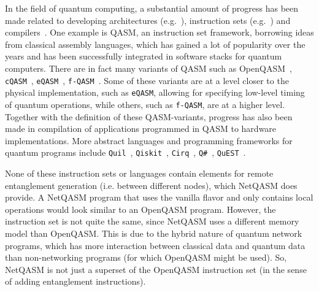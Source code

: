 In the field of quantum computing, a substantial amount of progress has been made related to developing
architectures (e.g.~\cite{fu2017microarchitecture,bourassa2020photonicblueprint, murali2019fullstack, wecker2014liqui, khammassi2020openql, amy2019staq, green2013quipper, Steiger2016}),
instruction sets (e.g.~\cite{cross2017openqasm,khammassi2018cqasm,fu2019eqasm,liu2017fqasm,smith2016quil,qiskit,cirq,qsharp,jones2019quest}) and
compilers~\cite{zulehner2019compiling, haner2018software, gokhale2020quantum, liu2020new, gokhale2020optimized, ding2020square, smith2020opensource, Sivarajah_2020, hietala2019verified, zhang2020contextmapping, niu2020hardware, dury2020qubo, pozzi2020using, Nishio_2020}.
One example is QASM, an instruction set framework, borrowing ideas from classical assembly languages, which has gained a lot of popularity over the years and has been successfully integrated in software stacks for quantum computers.
There are in fact many variants of QASM such as OpenQASM~\cite{cross2017openqasm}, \texttt{cQASM}~\cite{khammassi2018cqasm}, \texttt{eQASM}~\cite{fu2019eqasm}, \texttt{f-QASM}~\cite{liu2017fqasm}.
Some of these variants are at a level closer to the physical implementation, such as \texttt{eQASM}, allowing for specifying low-level timing of quantum operations, while others, such as \texttt{f-QASM}, are at a higher level.
Together with the definition of these QASM-variants, progress has also been made in compilation of applications programmed in QASM to hardware implementations.
More abstract languages and programming frameworks for quantum programs include \texttt{Quil}~\cite{smith2016quil}, \texttt{Qiskit}~\cite{qiskit}, \texttt{Cirq}~\cite{cirq}, \texttt{Q\#}~\cite{qsharp}, \texttt{QuEST}~\cite{jones2019quest}.

None of these instruction sets or languages contain elements for remote entanglement generation (i.e. between different nodes), which \ac{NetQASM} does provide.
A \ac{NetQASM} program that uses the vanilla flavor and only contains local operations would look similar to an OpenQASM program.
However, the instruction set is not quite the same, since \ac{NetQASM} uses a different memory model than OpenQASM.
This is due to the hybrid nature of quantum network programs, which has more interaction between classical data and quantum data than non-networking programs (for which OpenQASM might be used).
So, \ac{NetQASM} is not just a superset of the OpenQASM instruction set (in the sense of adding entanglement instructions).

